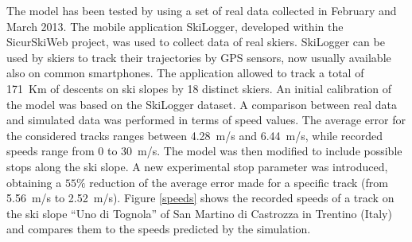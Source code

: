 \documentclass[12pt,a4paper,twoside]{book}
\begin{document}
The model has been tested by using a set of real data collected in February and March 2013. The mobile application SkiLogger, developed within the SicurSkiWeb project, was used to collect data of real skiers. SkiLogger can be used by skiers to track their trajectories by GPS sensors, now usually available also on common smartphones. The application allowed to track a total of 171~Km of descents on ski slopes by 18 distinct skiers. An initial calibration of the model was based on the SkiLogger dataset. A comparison between real data and simulated data was performed in terms of speed values. The average error for the considered tracks ranges between 4.28~m/s and 6.44~m/s, while recorded speeds range from 0 to 30~m/s. The model was then modified to include possible stops along the ski slope. A new experimental stop parameter was introduced, obtaining a $55\%$ reduction of the average error made for a specific track (from 5.56~m/s to 2.52~m/s). Figure \ref{speeds} shows the recorded speeds of a track on the ski slope ``Uno di Tognola'' of San Martino di Castrozza in Trentino (Italy) and compares them to the speeds predicted by the simulation.
\end{document}
